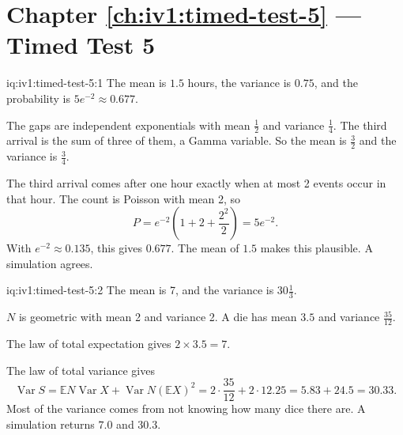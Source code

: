 \section*{Chapter \ref{ch:iv1:timed-test-5} --- Timed Test 5}

\enlargethispage{-2\baselineskip}%
\begin{solution}{iq:iv1:timed-test-5:1}
The mean is $1.5$ hours, the variance is $0.75$, and the probability is $5e^{-2} \approx 0.677$.

The gaps are independent exponentials with mean $\frac12$ and variance $\frac14$. The third arrival is the sum of three of them, a Gamma variable. So the mean is $\frac32$ and the variance is $\frac34$.

The third arrival comes after one hour exactly when at most 2 events occur in that hour. The count is Poisson with mean 2, so
\[
P = e^{-2}\left(1 + 2 + \frac{2^2}{2}\right) = 5e^{-2}.
\]
With $e^{-2} \approx 0.135$, this gives $0.677$. The mean of $1.5$ makes this plausible. A simulation agrees.

\end{solution}

\begin{solution}{iq:iv1:timed-test-5:2}
The mean is 7, and the variance is $30\frac13$.

$N$ is geometric with mean 2 and variance 2. A die has mean $3.5$ and variance $\frac{35}{12}$.

The law of total expectation gives $2 \times 3.5 = 7$.

The law of total variance gives
\[
\operatorname{Var}S = \mathbb{E}N\operatorname{Var}X + \operatorname{Var}N(\mathbb{E}X)^2 = 2 \cdot \frac{35}{12} + 2 \cdot 12.25 = 5.83 + 24.5 = 30.33.
\]
Most of the variance comes from not knowing how many dice there are. A simulation returns $7.0$ and $30.3$.

\end{solution}

